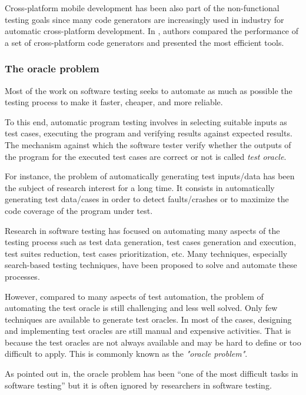Cross-platform mobile development has been also part of the non-functional testing goals since many code generators are increasingly used in industry for automatic cross-platform development. In \cite{pazirandeh2015evaluation,hartmann2011cross}, authors compared the performance of a set of cross-platform code generators and presented the most efficient tools.
\subsubsection{The oracle problem}

Most of the work on software testing seeks to automate as much as possible the testing process to make it faster, cheaper, and more reliable. 

To this end, automatic program testing involves in selecting suitable inputs as test cases, executing the program and verifying results against expected results. 
The mechanism against which the software tester verify whether the outputs of the program for the executed test cases are correct or not is called \textit{test oracle}. 

For instance, the problem of automatically generating test inputs/data has been the subject of research interest for a long time. It consists in automatically generating test data/cases in order to detect faults/crashes or to maximize the code coverage of the program under test. 


Research in software testing has focused on automating many aspects of the testing process such as test data generation, test cases generation and execution, test suites reduction, test cases prioritization, etc. Many techniques, especially search-based testing techniques, have been proposed to solve and automate these processes\cite{ali2010systematic}.

However, compared to many aspects of test automation, the problem of automating the test oracle is still challenging and less well solved. Only few techniques are available to generate test oracles. In most of the cases, designing and implementing test oracles are still manual and expensive activities. That is because the test oracles are not always available and may be hard to define or too difficult to apply\cite{barr2015oracle}. This is commonly known as the \textit{"oracle problem"}. 

As pointed out in\cite{manolache2001software}, the oracle problem has been “one of the most difficult tasks in software testing” but it is often ignored by researchers in software testing.

